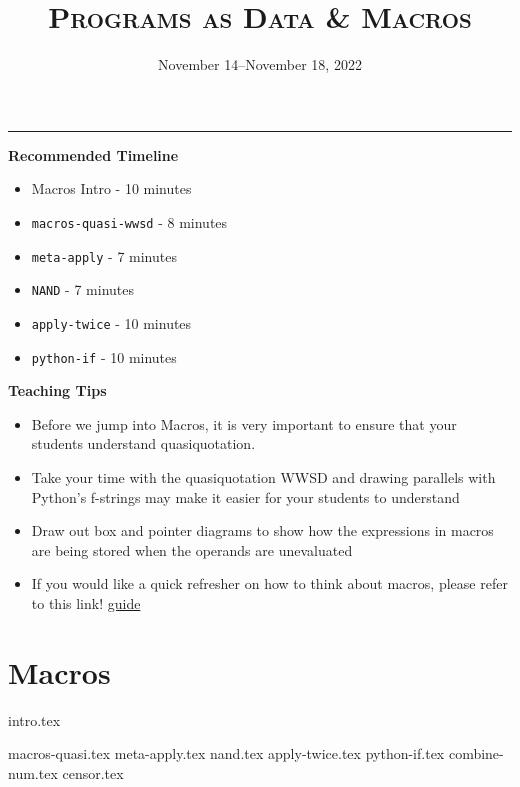 \documentclass{exam}
\title{\textsc{Programs as Data \& Macros}}
\date{November 14--November 18, 2022}
\begin{document}
\maketitle
\rule{\textwidth}{0.15em}

\begin{meta}
\begin{blocksection}
    \textbf{Recommended Timeline}
    \begin{itemize}
        \item Macros Intro - 10 minutes
        \item \lstinline{macros-quasi-wwsd} - 8 minutes
        \item \lstinline{meta-apply} - 7 minutes
        \item \lstinline{NAND} - 7 minutes
        \item \lstinline{apply-twice} - 10 minutes
        \item \lstinline{python-if} - 10 minutes
    \end{itemize}
\end{blocksection}
\end{meta}
\begin{meta}
\textbf{Teaching Tips}
\begin{itemize}
    \item Before we jump into Macros, it is very important to ensure that your students understand quasiquotation.
    \item Take your time with the quasiquotation WWSD and drawing parallels with Python's f-strings may make it easier for your students to understand 
    \item Draw out box and pointer diagrams to show how the expressions in macros are being stored when the operands are unevaluated
    \item If you would like a quick refresher on how to think about macros, please refer to this link! \href{https://docs.google.com/document/d/1JSbvtJ5bYUEhovDZd_gQnBvkG_WDcafmX-4B3QeIXZU/edit}{guide}
\end{itemize}
\end{meta}

\section{Macros}
{intro.tex}
\begin{questions}
{macros-quasi.tex}
{meta-apply.tex}
{nand.tex}
{apply-twice.tex}
{python-if.tex}
{combine-num.tex}
{censor.tex}
\end{questions}
\end{document}
